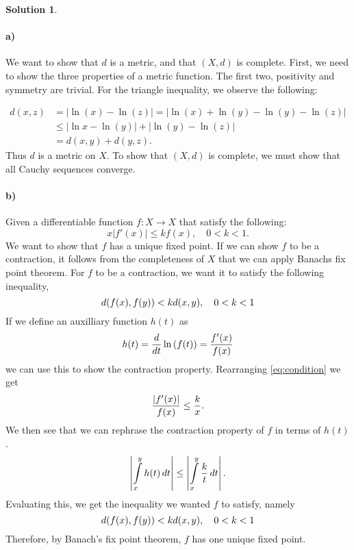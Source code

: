 \documentclass[a4paper]{article}
\theoremstyle{definition}
\newtheorem{sol}{Solution}
\begin{document}
\begin{sol}
\item\paragraph{a)}
We want to show that $d$ is a metric, and that $\left( X, d \right)$ is
complete.  First, we need to show the three properties of a metric function.
The first two, positivity and symmetry are trivial.  For the triangle
inequality, we observe the following:

\begin{align*}
  d(x, z) &= | \ln(x) - \ln(z)| = | \ln(x) + \ln(y) - \ln(y) - \ln(z) | \\
          &\leq |\ln x - \ln(y) | + |\ln(y) - \ln(z) | \\
          &= d(x, y) + d(y, z).
\end{align*}
Thus $d$ is a metric on $X$. To show that $\left( X, d \right)$ is complete, we
must show that all Cauchy sequences converge.

\paragraph{b)}

Given a differentiable function $f: X \longrightarrow X$ that satisfy the following:
\begin{equation}
  \label{eq:condition}
  x\left|f'(x)\right| \leq kf(x), \quad 0 < k < 1.
\end{equation}
We want to show that $f$ has a unique fixed point.  If we can show $f$ to be a
contraction, it follows from the completeness of $X$ that we can apply Banachs
fix point theorem.  For $f$ to be a contraction, we want it to satisfy the
following inequality,
\begin{equation}
  \notag
  d(f(x), f(y)) < kd(x, y), \quad 0 < k < 1
\end{equation}
If we define an auxilliary function $h(t)$ as
\begin{equation}
  \notag
  h(t) = \frac{d}{dt} \ln\left(f(t)\right)  = \frac{f'(x)}{f(x)}
\end{equation} 
we can use this to show the contraction property.  Rearranging
\eqref{eq:condition} we get
\begin{equation}
  \notag
  \frac{\left| f'(x)\right|}{f(x)} \leq \frac{k}{x}.
\end{equation}
We then see that we can rephrase the contraction property of $f$ in terms of $h(t)$.
\begin{equation}
  \notag
  \left| \int\limits_{x}^{y} h(t) \, dt  \right|  \leq \left| \int\limits_{x}^{y} \frac{k}{t} \, dt \right|.
\end{equation}
Evaluating this, we get the inequality we wanted $f$ to satisfy, namely
\begin{equation}
  \notag
  d(f(x), f(y)) < kd(x, y), \quad 0 < k < 1
  \end{equation}
  Therefore, by Banach's fix point theorem, $f$ has one unique fixed point.

\end{sol}
\end{document}
